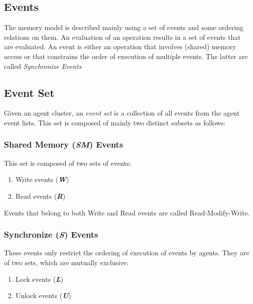 \subsection{Events}
        
The memory model is described mainly using a set of events and some ordering relations on them. An evaluation of an operation results in a set of events that are evaluated. An event is either an operation that involves (shared) memory access or that constrains the order of execution of multiple events. The latter are called \textit{Synchronize Events}


    
    \newcommand{\rmw}{\textit{rmw}\,}
    \newcommand{\set}[1]{\textbf{\textit{#1}}}

    \subsection{Event Set}
    Given an agent cluster, an \textit{event set} is a collection of all events from the agent event lists. This set is composed of mainly two distinct subsets as follows: 
       
        \subsubsection{Shared Memory (\set{SM}) Events} This set is composed of two sets of events: 
            
            \begin{enumerate}
                \item Write events (\set{W})
                \item Read events (\set{R}) 
            \end{enumerate}
            Events that belong to both Write and Read events are called Read-Modify-Write. 
        \subsubsection{Synchronize (\set{S}) Events} These events only restrict the ordering of execution of events by agents. They are of two sets, which are mutually exclusive:
            \begin{enumerate}
                \item Lock events (\set{L})
                \item Unlock events (\set{U}) 
            \end{enumerate}
            
